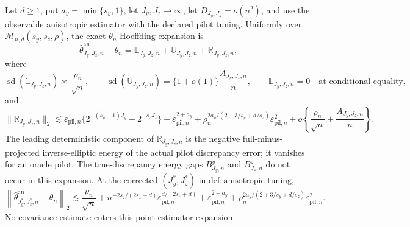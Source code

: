 Let \(d\ge1\), put \(a_y=\min\{s_y,1\}\), let \(J_y,J_z\to\infty\), let \(D_{J_y,J_z}=o(n^2)\), and use the observable anisotropic estimator with the declared pilot tuning. Uniformly over \(\mathcal M_{n,d}(s_y,s_z,\rho)\), the exact-\(\theta_n\) Hoeffding expansion is
\[
\widehat\theta^{\mathrm{an}}_{J_y,J_z,n}-\theta_n
=\mathbb L_{J_y,J_z,n}+\mathbb U_{J_y,J_z,n}+\mathbb R_{J_y,J_z,n},
\]
where
\[
\operatorname{sd}(\mathbb L_{J_y,J_z,n})\asymp\frac{\rho_n}{\sqrt n},
\qquad
\operatorname{sd}(\mathbb U_{J_y,J_z,n})=\{1+o(1)\}\frac{A_{J_y,J_z,n}}n,
\qquad
\mathbb L_{J_y,J_z,n}=0
\quad\text{at conditional equality},
\]
and
\[
\|\mathbb R_{J_y,J_z,n}\|_2
\lesssim
\varepsilon_{\mathrm{pil},n}\{2^{-(s_y+1)J_y}+2^{-s_zJ_z}\}
+\varepsilon_{\mathrm{pil},n}^{2+a_y}
+\rho_n^{2a_y/(2+3/s_y+d/s_z)}\varepsilon_{\mathrm{pil},n}^2
+o\!\left\{\frac{\rho_n}{\sqrt n}+\frac{A_{J_y,J_z,n}}n\right\}.
\]
The leading deterministic component of \(\mathbb R_{J_y,J_z,n}\) is the negative full-minus-projected inverse-elliptic energy of the actual pilot discrepancy error; it vanishes for an oracle pilot.  The true-discrepancy energy gaps \(B^y_{J_y,n}\) and \(B^z_{J_z,n}\) do not occur in this expansion. At the corrected \((J_y^*,J_z^*)\) in \(\mathrm{def{:}anisotropic\text{-}tuning}\),
\[
\left\|\widehat\theta^{\mathrm{an}}_{J_y^*,J_z^*,n}-\theta_n\right\|_2
\lesssim
\frac{\rho_n}{\sqrt n}
+n^{-2s_z/(2s_z+d)}\varepsilon_{\mathrm{pil},n}^{d/(2s_z+d)}
+\varepsilon_{\mathrm{pil},n}^{2+a_y}
+\rho_n^{2a_y/(2+3/s_y+d/s_z)}\varepsilon_{\mathrm{pil},n}^2.
\]
No covariance estimate enters this point-estimator expansion.